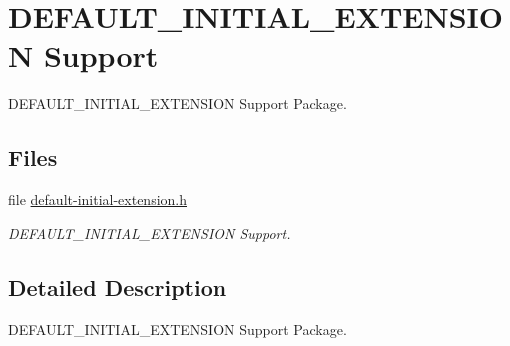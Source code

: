 \hypertarget{group__shared__defaultinitialextension}{}\section{D\+E\+F\+A\+U\+L\+T\+\_\+\+I\+N\+I\+T\+I\+A\+L\+\_\+\+E\+X\+T\+E\+N\+S\+I\+ON Support}
\label{group__shared__defaultinitialextension}


D\+E\+F\+A\+U\+L\+T\+\_\+\+I\+N\+I\+T\+I\+A\+L\+\_\+\+E\+X\+T\+E\+N\+S\+I\+ON Support Package.  


\subsection*{Files}
\begin{DoxyCompactItemize}
\item 
file \mbox{\hyperlink{default-initial-extension_8h}{default-\/initial-\/extension.\+h}}
\begin{DoxyCompactList}\small\item\em D\+E\+F\+A\+U\+L\+T\+\_\+\+I\+N\+I\+T\+I\+A\+L\+\_\+\+E\+X\+T\+E\+N\+S\+I\+ON Support. \end{DoxyCompactList}\end{DoxyCompactItemize}


\subsection{Detailed Description}
D\+E\+F\+A\+U\+L\+T\+\_\+\+I\+N\+I\+T\+I\+A\+L\+\_\+\+E\+X\+T\+E\+N\+S\+I\+ON Support Package. 

